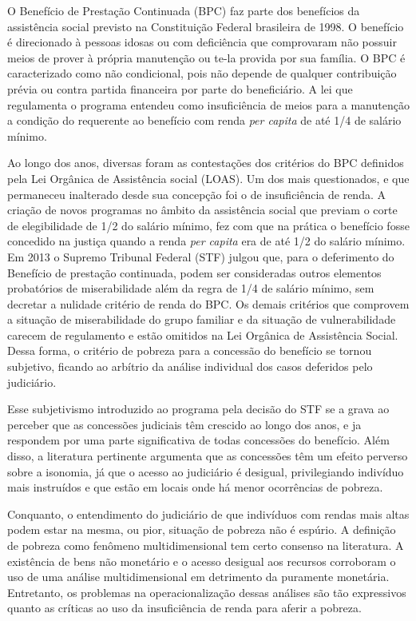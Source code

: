 \documentclass[
	12pt,				%
	openright,			%
	twoside,			%
	a4paper,			%
	english,			%
	french,				%
	spanish,			%
	brazil				%
	]{abntex2}
\begin{document}
O Benefício de Prestação Continuada (BPC) faz parte dos benefícios da assistência social previsto na Constituição Federal brasileira de 1998. O benefício é direcionado à pessoas idosas ou com deficiência que comprovaram não possuir meios de prover à própria manutenção ou te-la provida por sua família. O BPC é caracterizado como não condicional, pois não depende de qualquer contribuição prévia ou contra partida financeira por parte do beneficiário. A lei que regulamenta o programa entendeu como insuficiência de meios para a manutenção a condição do requerente ao benefício com renda \textit{per capita} de até 1/4 de salário mínimo. 

Ao longo dos anos, diversas foram as contestações dos critérios do BPC definidos pela Lei Orgânica de Assistência social (LOAS). Um dos mais questionados, e que permaneceu inalterado desde sua concepção foi o de insuficiência de renda. A criação de novos programas no âmbito da assistência social que previam o corte de elegibilidade de 1/2 do salário mínimo, fez com que na prática o benefício fosse concedido na justiça quando a renda \textit{per capita} era de até 1/2 do salário mínimo. Em 2013 o Supremo Tribunal Federal (STF) julgou que, para o deferimento do Benefício de prestação continuada, podem ser consideradas outros elementos probatórios de miserabilidade além da regra de 1/4 de salário mínimo, sem decretar a nulidade critério de renda do BPC. Os demais critérios que comprovem a situação de miserabilidade do grupo familiar e da situação de vulnerabilidade carecem de regulamento e estão omitidos na Lei Orgânica de Assistência Social. Dessa forma, o critério de pobreza para a concessão do benefício se tornou subjetivo, ficando ao arbítrio da análise individual dos casos deferidos pelo judiciário. 
 
Esse subjetivismo introduzido ao programa pela decisão do STF se a grava ao perceber que as concessões judiciais têm crescido ao longo dos anos, e ja respondem por uma parte significativa de todas concessões do benefício. Além disso, a literatura pertinente argumenta que as concessões têm um efeito perverso sobre a isonomia, já que o acesso ao judiciário é desigual, privilegiando indivíduo mais instruídos e que estão em locais onde há menor ocorrências de pobreza.

Conquanto, o entendimento do judiciário de que indivíduos com rendas mais altas podem estar na mesma, ou pior, situação de pobreza não é espúrio. A definição de pobreza como fenômeno multidimensional tem certo consenso na literatura. A existência de bens não monetário e o acesso desigual aos recursos corroboram o uso de uma análise multidimensional em detrimento da puramente monetária. Entretanto, os problemas na operacionalização dessas análises são tão expressivos quanto as críticas ao uso da insuficiência de renda para aferir a pobreza. 
\end{document}
